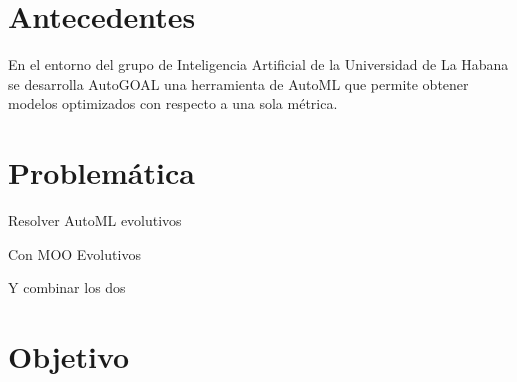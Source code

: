 





\section*{Antecedentes}
En el entorno del grupo de Inteligencia Artificial de la Universidad de La Habana se desarrolla AutoGOAL una herramienta de AutoML que permite obtener modelos optimizados con respecto a una sola m\'etrica.

\section*{Problem\'atica}
Resolver AutoML evolutivos 

Con MOO Evolutivos

Y combinar los dos



\section*{Objetivo}
